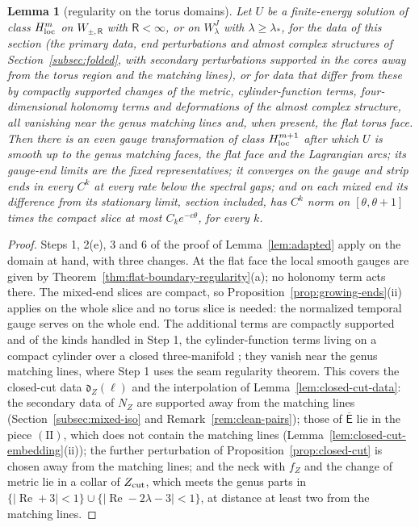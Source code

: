 \documentclass[11pt]{amsart}
\newtheorem{lemma}[theorem]{Lemma}
\theoremstyle{definition}
\theoremstyle{remark}
\theoremstyle{plain}
\numberwithin{equation}{section}
\begin{document}
\begin{lemma}[regularity on the torus domains]\label{lem:torus-regularity}
Let $U$ be a finite-energy solution of class $H^m_{\rm loc}$ on $W_{\pm,\mathsf R}$ with $\mathsf R<\infty$, or on
$W^J_\lambda$ with $\lambda\ge\lambda_*$, for the data of this section (the primary data, end
perturbations and almost complex structures of Section~\ref{subsec:folded}, with secondary
perturbations supported in the cores away from the torus region and the matching lines),
or for data that differ from these by compactly supported changes of the metric, cylinder-function terms,
four-dimensional holonomy terms and deformations of the almost complex structure, all
vanishing near the genus matching lines and, when present, the
flat torus face. Then there is an even gauge transformation of class
$H^{m+1}_{\rm loc}$ after which $U$ is smooth up to the genus matching faces, the flat face and
the Lagrangian arcs; its gauge-end limits are the fixed representatives; it converges on the
gauge and strip ends in every $C^k$ at every rate below the spectral gaps; and on each mixed
end its difference from its stationary limit, section included, has $C^k$ norm on
$[\theta,\theta+1]$ times the compact slice at most $C_ke^{-c\theta}$, for every $k$.
\end{lemma}

\begin{proof}
Steps 1, 2(e), 3 and 6 of the proof of Lemma~\ref{lem:adapted} apply on the domain at hand,
with three changes. At the flat face the local smooth gauges are given by
Theorem~\ref{thm:flat-boundary-regularity}(a); no holonomy term acts there. The mixed-end
slices are compact, so Proposition~\ref{prop:growing-ends}(ii) applies on the whole slice and
no torus slice is needed: the normalized temporal gauge serves on the whole end. The
additional terms are compactly supported and of the kinds handled in Step 1, the
cylinder-function terms living on a compact cylinder over a closed three-manifold
\cite[Sections~3.4--3.5]{KM-unknot}; they vanish near the genus matching lines, where Step 1
uses the seam regularity theorem. This covers the closed-cut data $\mathfrak d_Z(\ell)$ and the
interpolation of Lemma~\ref{lem:closed-cut-data}: the secondary data of $N_Z$ are supported
away from the matching lines (Section~\ref{subsec:mixed-iso} and
Remark~\ref{rem:clean-pairs}); those of $\overline{\mathsf E}$ lie in the piece $\mathrm{(II)}$, which does not
contain the matching lines (Lemma~\ref{lem:closed-cut-embedding}(ii)); the further
perturbation of Proposition~\ref{prop:closed-cut} is chosen away from the matching lines; and
the neck with $f_Z$ and the change of metric lie in a collar of $Z_{\rm cut}$, which meets the
genus parts in $\{|\operatorname{Re}+3|<1\}\cup
\{|\operatorname{Re}-2\lambda-3|<1\}$, at distance at least two
from the matching lines.
\end{proof}
\end{document}
